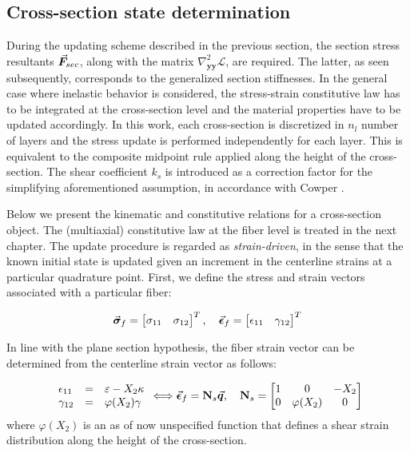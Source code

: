 \subsection{Cross-section state determination}\label{subsection:CH2-S4SS5}

During the updating scheme described in the previous section, the section stress
resultants $\vec{\boldsymbol{F}}_{sec}$, along with the matrix
$\nabla_{\mathbf{yy}}^2\mathcal{L}$, are required. The latter, as seen
subsequently, corresponds to the generalized section stiffnesses. In the general
case where
inelastic behavior is considered, the stress-strain constitutive law has to be
integrated at the cross-section level and the material properties have to be
updated accordingly. In this work, each cross-section is discretized in $n_l$
number of layers and the stress update is performed independently for each 
layer.
This is equivalent to the composite midpoint rule applied along the height of
the cross-section. The shear coefficient $k_s$ is
introduced as a correction factor for the simplifying aforementioned assumption,
in accordance with Cowper \cite{Cowper}.

Below we present the kinematic and constitutive relations for a cross-section 
object. The (multiaxial) constitutive law at the fiber level is treated in the 
next chapter. The update
procedure is regarded as \emph{strain-driven}, in the sense that the known
initial state is updated given an increment in the centerline strains at a 
particular quadrature point. First, we define the stress and strain vectors 
associated with a particular fiber:

\begin{equation}
	\vec{\boldsymbol{\sigma}}_f = \begin{bmatrix}
		\sigma_{11} &  \sigma_{12}
	\end{bmatrix}^T,\quad
	\vec{\boldsymbol{\epsilon}}_f = \begin{bmatrix}
		\epsilon_{11}  & \gamma_{12}
	\end{bmatrix}^T
	\label{eq:FIBER_VECTOR_NOTATIONS}
\end{equation}

In line with the plane section hypothesis, the fiber strain vector can be 
determined from the centerline strain vector as follows:

\begin{equation}
	\begin{array}{lcl}
		\epsilon_{11} & = &\varepsilon-X_2\kappa \\
		\gamma_{12} &= &\varphi(X_2)\gamma
	\end{array}
	\Longleftrightarrow \vec{\boldsymbol{\epsilon}}_f = \mathbf{N}_s\vec{\boldsymbol{q}},\quad \mathbf{N}_s 
	=
	\begin{bmatrix}
		1 & 0 & -X_2\\
		0 & \varphi(X_2) & 0
	\end{bmatrix}
	\label{eq:SECTION_KIN}
\end{equation}
\noindent where $\varphi(X_2)$ is an as of now unspecified function that defines
a shear strain distribution along the height of the cross-section.


